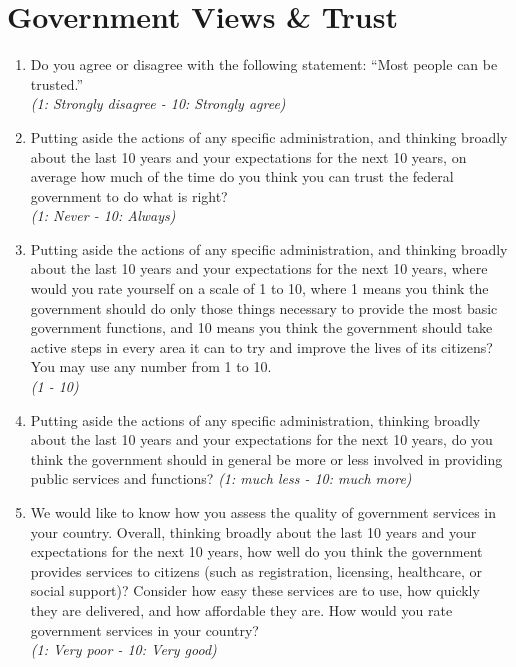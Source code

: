 \documentclass[11pt]{article}
\begin{document}
\section*{Government Views \& Trust}
\begin{enumerate}[resume]
    \item Do you agree or disagree with the following statement: “Most people can be trusted.” \\
    \textit{(1: Strongly disagree - 10: Strongly agree)}
    \item Putting aside the actions of any specific administration, and thinking broadly about the last 10 years and your expectations for the next 10 years, on average how much of the time do you think you can trust the federal government to do what is right? \\ \textit{(1: Never - 10: Always)} 
    \item Putting aside the actions of any specific administration, and thinking broadly about the last 10 years and your expectations for the next 10 years, where would you rate yourself on a scale of 1 to 10, where 1 means you think the government should do only those things necessary to provide the most basic government functions, and 10 means you think the government should take active steps in every area it can to try and improve the lives of its citizens? You may use any number from 1 to 10. \\\textit{(1 - 10)}
    \item Putting aside the actions of any specific administration, thinking broadly about the last 10 years and your expectations for the next 10 years, do you think the government should in general be more or less involved in providing public services and functions?
    \textit{(1: much less - 10: much more)}
    \item We would like to know how you assess the quality of government services in your country. Overall, thinking broadly about the last 10 years and your expectations for the next 10 years, how well do you think the government provides services to citizens (such as registration, licensing, healthcare, or social support)? Consider how easy these services are to use, how quickly they are delivered, and how affordable they are. How would you rate government services in your country? \\
    \textit{(1: Very poor - 10: Very good)}

\end{enumerate}
\end{document}
